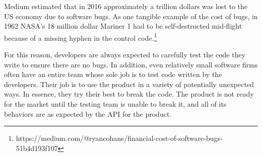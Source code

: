 Medium estimated that in 2016 approximately a trillion dollars was lost to the US economy due to software bugs. As one tangible example of the cost of bugs, in 1962 NASA's 18 million dollar Mariner 1 had to be self-destructed mid-flight because of a missing hyphen in the control code.\footnote{https://medium.com/@ryancohane/financial-cost-of-software-bugs-51b4d193f107}

For this reason, developers are always expected to carefully test the code they write to ensure there are no bugs. In addition, even relatively small software firms often have an entire team whose sole job is to test code written by the developers. Their job is to use the product in a variety of potentially unexpected ways. In essence, they try their best to break the code. The product is not ready for the market until the testing team is unable to break it, and all of its behaviors are as expected by the API for the product. 








